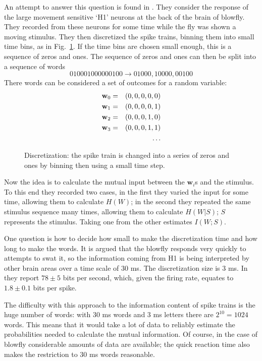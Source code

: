 \documentclass[12pt]{article}
\begin{document}
An attempt to answer this question is found in
\cite{StrongEtAl1998}. They consider the response of the large
movement sensitive \lq{}H1\rq{} neurons at the back of the brain of
blowfly. They recorded from these neurons for some time while the fly
was shown a moving stimulus. They then discretized the spike trains,
binning them into small time bins, as in
Fig.~\ref{fig_discretization}. If the time bins are chosen small
enough, this is a sequence of zeros and ones. The sequence of zeros
and ones can then be split into a sequence of words
\begin{equation}
010001000000100\rightarrow 01000,10000,00100
\end{equation}
There words can be considered a set of outcomes for a random variable:
\begin{eqnarray}
\textbf{w}_0&=&(0,0,0,0,0)\cr
\textbf{w}_1&=&(0,0,0,0,1)\cr
\textbf{w}_2&=&(0,0,0,1,0)\cr
\textbf{w}_3&=&(0,0,0,1,1)\cr
&&\ldots
\end{eqnarray}

\begin{figure}[htb]
\begin{center}

\end{center}
\caption{Discretization: the spike train is changed into a series of
  zeros and ones by binning then using a small time
  step.\label{fig_discretization}}
\end{figure}

Now the idea is to calculate the mutual input between the
$\textbf{w}_i$s and the stimulus. To this end they recorded two cases,
in the first they varied the input for some time, allowing them to
calculate $H(W)$; in the second they repeated the same stimulus
sequence many times, allowing them to calculate $H(W|S)$; $S$
represents the stimulus. Taking one from the other estimates $I(W;S)$. 

One question is how to decide how small to make the discretization
time and how long to make the words. It is argued that the blowfly
responds very quickly to attempts to swat it, so the information
coming from H1 is being interpreted by other brain areas over a
time scale of 30 ms. The discretization size is 3 ms. In
\cite{StrongEtAl1998} they report $78\pm 5$ bits per second, which,
given the firing rate, equates to $1.8\pm 0.1$ bits per spike. 

The difficulty with this approach to the information content of spike
trains is the huge number of words: with 30 ms words and 3 ms letters
there are $2^{10}=1024$ words. This means that it would take a lot of
data to reliably estimate the probabilities needed to calculate the
mutual information. Of course, in the case of blowfly considerable
amounts of data are available; the quick reaction time also makes the
restriction to 30 ms words reasonable. 


{}
\end{document}
